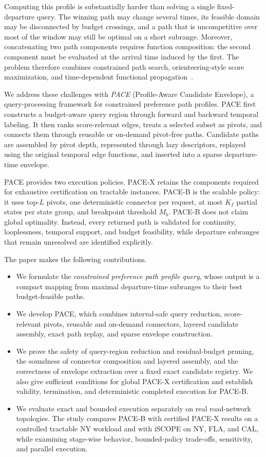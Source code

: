 \documentclass[a4paper,fleqn]{cas-dc}
\begin{document}
Computing this profile is substantially harder than solving a single fixed-departure query. The winning path may change several times, its feasible domain may be disconnected by budget crossings, and a path that is uncompetitive over most of the window may still be optimal on a short subrange. Moreover, concatenating two path components requires function composition: the second component must be evaluated at the arrival time induced by the first. The problem therefore combines constrained path search, orienteering-style score maximization, and time-dependent functional propagation~\cite{garroppo2010survey,pugliese2013survey,Verbeeck2014AOPCycle,lu2017scenic,YuanLianWangChenMaWang2019}.

We address these challenges with \emph{PACE} (Profile-Aware Candidate Envelope), a query-processing framework for constrained preference path profiles. PACE first constructs a budget-aware query region through forward and backward temporal labeling. It then ranks score-relevant edges, treats a selected subset as pivots, and connects them through reusable or on-demand pivot-free paths. Candidate paths are assembled by pivot depth, represented through lazy descriptors, replayed using the original temporal edge functions, and inserted into a sparse departure-time envelope.

PACE provides two execution policies. PACE-X retains the components required for exhaustive certification on tractable instances. PACE-B is the scalable policy: it uses top-\(L\) pivots, one deterministic connector per request, at most \(K_f\) partial states per state group, and breakpoint threshold \(M_b\). PACE-B does not claim global optimality. Instead, every returned path is validated for continuity, looplessness, temporal support, and budget feasibility, while departure subranges that remain unresolved are identified explicitly.

The paper makes the following contributions.
\begin{itemize}
    \item We formulate the \emph{constrained preference path profile query}, whose output is a compact mapping from maximal departure-time subranges to their best budget-feasible paths.
    \item We develop PACE, which combines interval-safe query reduction, score-relevant pivots, reusable and on-demand connectors, layered candidate assembly, exact path replay, and sparse envelope construction.
    \item We prove the safety of query-region reduction and residual-budget pruning, the soundness of connector composition and layered assembly, and the correctness of envelope extraction over a fixed exact candidate registry. We also give sufficient conditions for global PACE-X certification and establish validity, termination, and deterministic completed execution for PACE-B.
    \item We evaluate exact and bounded execution separately on real road-network topologies. The study compares PACE-B with certified PACE-X results on a controlled tractable NY workload and with iSCOPE on NY, FLA, and CAL, while examining stage-wise behavior, bounded-policy trade-offs, sensitivity, and parallel execution.
\end{itemize}
\end{document}
